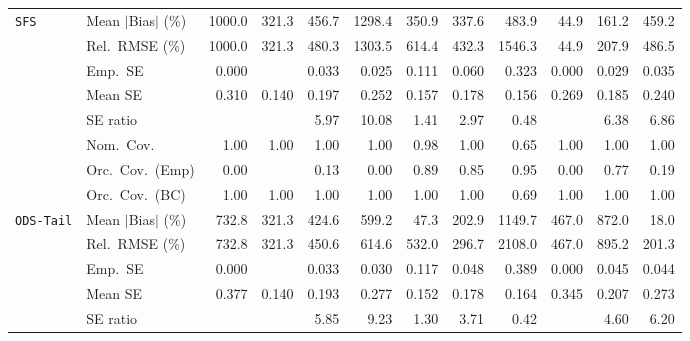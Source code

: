 \begin{landscape}
\begin{longtable}{llrrrrrrrrrr}
\addlinespace[2pt]
\quad \texttt{SFS} & Mean $|$Bias$|$ (\%) & 1000.0 & \cellcolor{rankthree}321.3 & 456.7 & 1298.4 & 350.9 & 337.6 & 483.9 & \cellcolor{rankone}44.9 & \cellcolor{ranktwo}161.2 & 459.2 \\
 & Rel.\ RMSE (\%) & 1000.0 & \cellcolor{rankthree}321.3 & 480.3 & 1303.5 & 614.4 & 432.3 & 1546.3 & \cellcolor{rankone}44.9 & \cellcolor{ranktwo}207.9 & 486.5 \\
 & Emp.\ SE & 0.000 &  & 0.033 & 0.025 & 0.111 & 0.060 & 0.323 & 0.000 & 0.029 & 0.035 \\
 & Mean SE & 0.310 & 0.140 & 0.197 & 0.252 & 0.157 & 0.178 & 0.156 & 0.269 & 0.185 & 0.240 \\
 & SE ratio &  &  & 5.97 & 10.08 & \cellcolor{rankone}1.41 & \cellcolor{rankthree}2.97 & \cellcolor{ranktwo}0.48 &  & 6.38 & 6.86 \\
 & Nom.\ Cov. & \cellcolor{ranktwo}1.00 & \cellcolor{ranktwo}1.00 & \cellcolor{ranktwo}1.00 & \cellcolor{ranktwo}1.00 & \cellcolor{rankone}0.98 & \cellcolor{ranktwo}1.00 & \cellcolor{rankthree}0.65 & \cellcolor{ranktwo}1.00 & \cellcolor{ranktwo}1.00 & \cellcolor{ranktwo}1.00 \\
 & Orc.\ Cov.\ (Emp) & 0.00 &  & 0.13 & 0.00 & \cellcolor{ranktwo}0.89 & \cellcolor{rankthree}0.85 & \cellcolor{rankone}0.95 & 0.00 & 0.77 & 0.19 \\
 & Orc.\ Cov.\ (BC) & \cellcolor{rankone}1.00 & \cellcolor{rankone}1.00 & \cellcolor{rankone}1.00 & \cellcolor{rankone}1.00 & \cellcolor{rankone}1.00 & \cellcolor{rankone}1.00 & \cellcolor{ranktwo}0.69 & \cellcolor{rankone}1.00 & \cellcolor{rankone}1.00 & \cellcolor{rankone}1.00 \\
\addlinespace[2pt]
\quad \texttt{ODS-Tail} & Mean $|$Bias$|$ (\%) & 732.8 & 321.3 & 424.6 & 599.2 & \cellcolor{ranktwo}47.3 & \cellcolor{rankthree}202.9 & 1149.7 & 467.0 & 872.0 & \cellcolor{rankone}18.0 \\
 & Rel.\ RMSE (\%) & 732.8 & \cellcolor{rankthree}321.3 & 450.6 & 614.6 & 532.0 & \cellcolor{ranktwo}296.7 & 2108.0 & 467.0 & 895.2 & \cellcolor{rankone}201.3 \\
 & Emp.\ SE & 0.000 &  & 0.033 & 0.030 & 0.117 & 0.048 & 0.389 & 0.000 & 0.045 & 0.044 \\
 & Mean SE & 0.377 & 0.140 & 0.193 & 0.277 & 0.152 & 0.178 & 0.164 & 0.345 & 0.207 & 0.273 \\
 & SE ratio &  &  & 5.85 & 9.23 & \cellcolor{rankone}1.30 & \cellcolor{rankthree}3.71 & \cellcolor{ranktwo}0.42 &  & 4.60 & 6.20 \\

\end{longtable}
\end{landscape}
